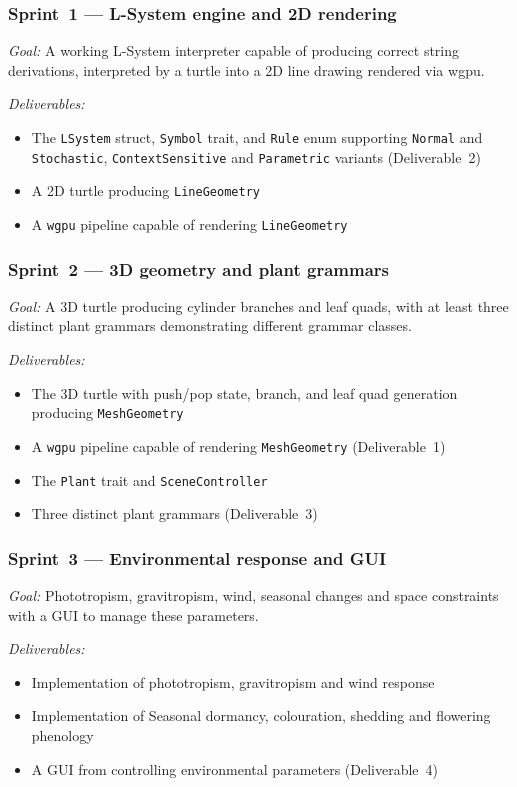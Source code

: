 \subsubsection{Sprint~1 — L-System engine and 2D rendering}
\textit{Goal:} A working L-System interpreter capable of producing correct string derivations, interpreted by
a turtle into a 2D line drawing rendered via wgpu.

\medskip
\textit{Deliverables:}
\begin{itemize}
  \item The \texttt{LSystem} struct, \texttt{Symbol} trait, and \texttt{Rule} enum supporting \texttt{Normal}
    and \texttt{Stochastic}, \texttt{ContextSensitive} and \texttt{Parametric} variants (Deliverable~2)
  \item A 2D turtle producing \texttt{LineGeometry}
  \item A \texttt{wgpu} pipeline capable of rendering \texttt{LineGeometry}
\end{itemize}

\subsubsection{Sprint~2 — 3D geometry and plant grammars}
\textit{Goal:} A 3D turtle producing cylinder branches and leaf quads, with at least three distinct plant
grammars demonstrating different grammar classes.

\medskip
\textit{Deliverables:}
\begin{itemize}
  \item The 3D turtle with push/pop state, branch, and leaf quad generation producing \texttt{MeshGeometry}
  \item A \texttt{wgpu} pipeline capable of rendering \texttt{MeshGeometry} (Deliverable~1)
  \item The \texttt{Plant} trait and \texttt{SceneController}
  \item Three distinct plant grammars (Deliverable~3)
\end{itemize}

\subsubsection{Sprint~3 — Environmental response and GUI}
\textit{Goal:} Phototropism, gravitropism, wind, seasonal changes and space constraints with a GUI to manage
these parameters.

\medskip
\textit{Deliverables:}
\begin{itemize}
  \item Implementation of phototropism, gravitropism and wind response
  \item Implementation of Seasonal dormancy, colouration, shedding and flowering phenology
  \item A GUI from controlling environmental parameters (Deliverable~4)
\end{itemize}

